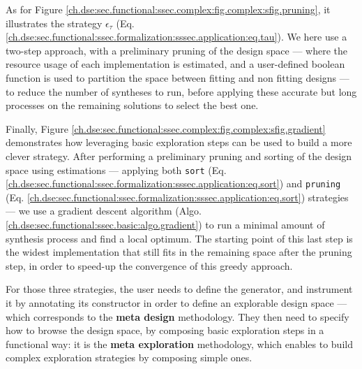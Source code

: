         As for Figure \ref{ch.dse:sec.functional:ssec.complex:fig.complex:sfig.pruning}, it illustrates the strategy $\epsilon_\tau$ (Eq. \ref{ch.dse:sec.functional:ssec.formalization:sssec.application:eq.tau}).
        We here use a two-step approach, with a preliminary pruning of the design space --- where the resource usage of each implementation is estimated, and a user-defined boolean function is used to partition the space between fitting and non fitting designs --- to reduce the number of syntheses to run, before applying these accurate but long processes on the remaining solutions to select the best one.

        Finally, Figure \ref{ch.dse:sec.functional:ssec.complex:fig.complex:sfig.gradient} demonstrates how leveraging basic exploration steps can be used to build a more clever strategy.
        After performing a preliminary pruning and sorting of the design space using  estimations --- \ie applying both {\tt sort} (Eq. \ref{ch.dse:sec.functional:ssec.formalization:sssec.application:eq.sort}) and {\tt pruning} (Eq. \ref{ch.dse:sec.functional:ssec.formalization:sssec.application:eq.sort}) strategies --- %
        we use a gradient descent algorithm (Algo. \ref{ch.dse:sec.functional:ssec.basic:algo.gradient}) to run a minimal amount of synthesis process and find a local optimum.
        The starting point of this last step is the widest implementation that still fits in the remaining space after the pruning step, in order to speed-up the convergence of this greedy approach.

        For those three strategies, the user needs to define the \chisel{} generator, and instrument it by annotating its constructor in order to define an explorable design space --- which corresponds to the {\bf meta design} methodology.
        They then need to specify how to browse the design space, by composing basic exploration steps in a functional way: it is the {\bf meta exploration} methodology, which enables to build complex exploration strategies by composing simple ones.

